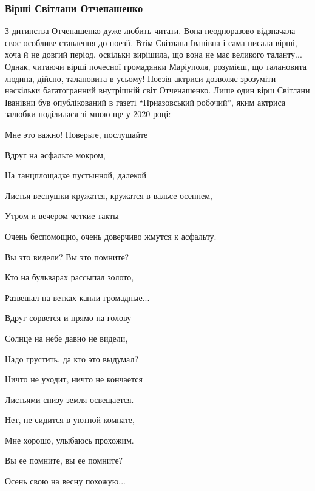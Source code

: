 \subsubsection{Вірші Світлани Отченашенко}


З дитинства Отченашенко дуже любить читати. Вона неодноразово відзначала своє
особливе ставлення до поезії. Втім Світлана Іванівна і сама писала вірші, хоча
й не довгий період, оскільки вирішила, що вона не має великого таланту... Однак,
читаючи вірші почесної громадянки Маріуполя, розумієш, що талановита людина,
дійсно, талановита в усьому! Поезія актриси дозволяє зрозуміти наскільки
багатогранний внутрішній світ Отченашенко. Лише один вірш Світлани Іванівни був
опублікований в газеті \enquote{Приазовський робочий}, яким актриса залюбки поділилася
зі мною ще у 2020 році:

\begin{center}
  \em\color{blue}\bfseries

Мне это важно! Поверьте, послушайте

Вдруг на асфальте мокром,

На танцплощадке пустынной, далекой

Листья-веснушки кружатся, кружатся в вальсе осеннем,

Утром и вечером четкие такты

Очень беспомощно, очень доверчиво жмутся к асфальту.

Вы это видели? Вы это помните?

Кто на бульварах рассыпал золото,

Развешал на ветках капли громадные...

Вдруг сорвется и прямо на голову

Солнце на небе давно не видели,

Надо грустить, да кто это выдумал?

Ничто не уходит, ничто не кончается

Листьями снизу земля освещается.

Нет, не сидится в уютной комнате,

Мне хорошо, улыбаюсь прохожим.

Вы ее помните, вы ее помните?

Осень свою на весну похожую... 
  
\end{center}



